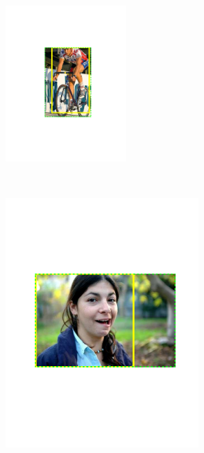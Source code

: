 \begin{figure}[hbt]
    \centering
    \begin{subfigure}[b]{0.37\textwidth}
        \centering
        \includegraphics[width=0.5\textwidth]{TP34}
        \caption{}
        \label{fig:dettp1}
    \end{subfigure}
    ~
    \begin{subfigure}[b]{0.37\textwidth}
        \centering
        \includegraphics[width=0.8\textwidth]{TP43}
        \caption{}
        \label{fig:dettp2}
    \end{subfigure}
    

\end{figure}
